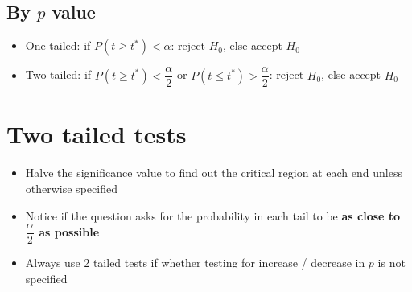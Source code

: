 \subsection{By $p$ value}
\begin{itemize}
	\item One tailed: if $P(t\geq t^*) < \alpha$: reject $H_0$, else accept $H_0$
	\item Two tailed: if $P(t\geq t^*) < \dfrac{\alpha}{2}$ or $P(t\leq t^*) > \dfrac{\alpha}{2}$: reject $H_0$, else accept $H_0$
\end{itemize}

\begin{comment}
	\subsection{Presenting the solution}
	\begin{enumerate}
		\item Define the test statistic, $X$ and the parameter, $p$
		\item Formulate a model for $X$ ($X \sim B(n, p)$)
		\item Write down $H_0$ and $H_1$ as statements involving $p$ (these determine whether your test is one or two-tailed)
		\item Specify the significance level
		\item Decide whether to reject $H_0$ by comparing $t^*$ to critical value or finding the probability of $t^*$ taking $x$ or a more extreme value
		\item State your conclusion: there is / is not sufficient evidence to reject $H_0$ + a statement \textbf{in the context of the question}
	\end{enumerate}
	
\end{comment}


\section{Two tailed tests}
\begin{itemize}
	\item Halve the significance value to find out the critical region at each end unless otherwise specified
	\item Notice if the question asks for the probability in each tail to be \textbf{as close to $\dfrac{\alpha}{2}$ as possible}
	\item Always use 2 tailed tests if whether testing for increase / decrease in $p$ is not specified
\end{itemize}

